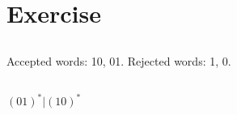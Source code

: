 \documentclass[12pt]{article}
\begin{document}
\maketitle

\section{Exercise}
\subsection{}
Accepted words: 10, 01. Rejected words: 1, 0.

\subsection{}
$(01)^*|(10)^*$
\end{document}
